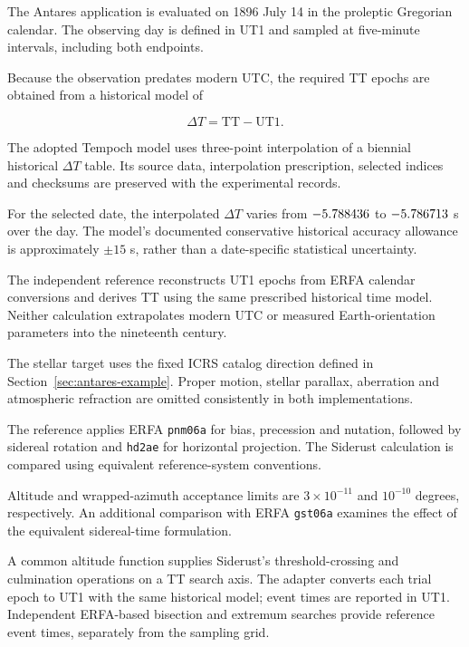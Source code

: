 The Antares application is evaluated on 1896 July 14 in the proleptic Gregorian calendar. The
observing day is defined in UT1 and sampled at five-minute intervals, including both endpoints.

Because the observation predates modern UTC, the required TT epochs are obtained from a historical
model of

\begin{equation}
    \Delta T = \mathrm{TT}-\mathrm{UT1}.
\end{equation}

The adopted Tempoch model \cite{tempochHistoricalTime} uses three-point interpolation of a biennial
historical $\Delta T$ table. Its source data, interpolation prescription, selected indices and
checksums are preserved with the experimental records.

For the selected date, the interpolated $\Delta T$ varies from $-5.788436$ to
$-5.786713$ s over the day. The model's documented conservative historical accuracy
allowance is approximately $\pm15$ s, rather than a date-specific statistical uncertainty.

The independent reference reconstructs UT1 epochs from ERFA calendar conversions and derives TT
using the same prescribed historical time model. Neither calculation extrapolates modern UTC or
measured Earth-orientation parameters into the nineteenth century.

The stellar target uses the fixed ICRS catalog direction defined in
Section~\ref{sec:antares-example}. Proper motion, stellar parallax, aberration and atmospheric
refraction are omitted consistently in both implementations.

The reference applies ERFA \texttt{pnm06a} for bias, precession and nutation, followed by sidereal
rotation and \texttt{hd2ae} for horizontal projection. The Siderust calculation is compared using
equivalent reference-system conventions.

Altitude and wrapped-azimuth acceptance limits are $3\times10^{-11}$ and $10^{-10}$ degrees,
respectively. An additional comparison with ERFA \texttt{gst06a} examines the effect of the
equivalent sidereal-time formulation.

A common altitude function supplies Siderust's threshold-crossing and culmination operations on a
TT search axis. The adapter converts each trial epoch to UT1 with the same historical model; event
times are reported in UT1. Independent ERFA-based bisection and extremum searches provide reference
event times, separately from the sampling grid.

